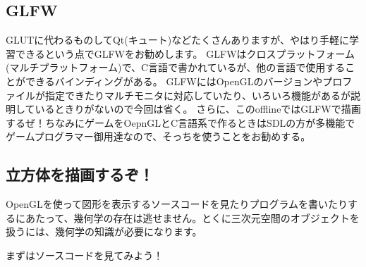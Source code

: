 \documentclass[a4paper,titlepage]{jsarticle}
\begin{document}
\subsection{GLFW}
GLUTに代わるものしてQt(キュート)などたくさんありますが、やはり手軽に学習できるという点でGLFWをお勧めします。
GLFWはクロスプラットフォーム(マルチプラットフォーム)で、C言語で書かれているが、他の言語で使用することができるバインディングがある。
GLFWにはOpenGLのバージョンやプロファイルが指定できたりマルチモニタに対応していたり、いろいろ機能があるが説明しているときりがないので今回は省く。
さらに、このofflineではGLFWで描画するぜ！ちなみにゲームをOepnGLとC言語系で作るときはSDLの方が多機能でゲームプログラマー御用達なので、そっちを使うことをお勧めする。\newpage

\subsection{立方体を描画するぞ！}
OpenGLを使って図形を表示するソースコードを見たりプログラムを書いたりするにあたって、幾何学の存在は逃せません。とくに三次元空間のオブジェクトを扱うには、幾何学の知識が必要になります。

まずはソースコードを見てみよう！
\end{document}
